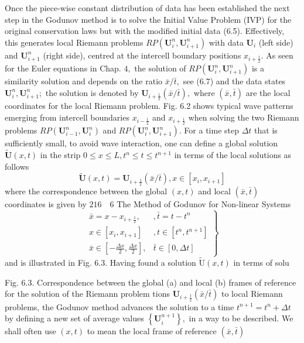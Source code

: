 Once the piece-wise constant distribution of data has been established the next step in the Godunov method is to solve the Initial Value Problem (IVP) for the original conservation laws but with the modified initial data (6.5). Effectively, this generates local Riemann problems $R P\left(\mathbf{U}_{i}^{n}, \mathbf{U}_{i+1}^{n}\right)$ with data $\mathbf{U}_{i}$ (left side) and $\mathbf{U}_{i+1}^{n}$ (right side), centred at the intercell boundary positions $x_{i+\frac{1}{2}}$. As seen for the Euler equations in Chap. $4,$ the solution of $R P\left(\mathbf{U}_{i}^{n}, \mathbf{U}_{i+1}^{n}\right)$ is a similarity solution and depends on the ratio $\bar{x} / \bar{t},$ see (6.7) and the data states $\mathbf{U}_{i}^{n}, \mathbf{U}_{i+1}^{n} ;$ the solution is denoted by $\mathbf{U}_{i+\frac{1}{2}}(\bar{x} / \bar{t}),$ where $(\bar{x}, \bar{t})$ are the local coordinates for the local Riemann problem. Fig. 6.2 shows typical wave patterns emerging from intercell boundaries $x_{i-\frac{1}{2}}$ and $x_{i+\frac{1}{2}}$ when solving the two Riemann problems $R P\left(\mathbf{U}_{i-1}^{n}, \mathbf{U}_{i}^{n}\right)$ and $R P\left(\mathbf{U}_{i}^{n}, \mathbf{U}_{i+1}^{n}\right)$. For a
time step $\Delta t$ that is sufficiently small, to avoid wave interaction, one can define a global solution $\widetilde{\mathbf{U}}(x, t)$ in the strip $0 \leq x \leq L, t^{n} \leq t \leq t^{n+1}$ in terms of the local solutions as follows
$$
\widetilde{\mathbf{U}}(x, t)=\mathbf{U}_{i+\frac{1}{2}}(\bar{x} / \bar{t}), x \in\left[x_{i}, x_{i+1}\right]
$$
where the correspondence between the global $(x, t)$ and local $(\bar{x}, \bar{t})$ coordinates is given by
$216 \quad 6$ The Method of Godunov for Non-linear Systems
$$
\left.\begin{array}{ll}
\bar{x}=x-x_{i+\frac{1}{2}}, & , \bar{t}=t-t^{n} \\
x \in\left[x_{i}, x_{i+1}\right] & , t \in\left[t^{n}, t^{n+1}\right] \\
\bar{x} \in\left[-\frac{\Delta x}{2}, \frac{\Delta x}{2}\right], & \bar{t} \in[0, \Delta t]
\end{array}\right\}
$$
and is illustrated in Fig. $6.3 .$ Having found a solution $\widetilde{\mathrm{U}}(x, t)$ in terms of solu

Fig. 6.3. Correspondence between the global (a) and local (b) frames of reference for the solution of the Riemann problem
tions $\mathbf{U}_{i+\frac{1}{2}}(\bar{x} / \bar{t})$ to local Riemann problems, the Godunov method advances the solution to a time $t^{n+1}=t^{n}+\Delta t$ by defining a new set of average values $\left\{\mathbf{U}_{i}^{n+1}\right\},$ in a way to be described. We shall often use $(x, t)$ to mean the local frame of reference $(\bar{x}, \bar{t})$

